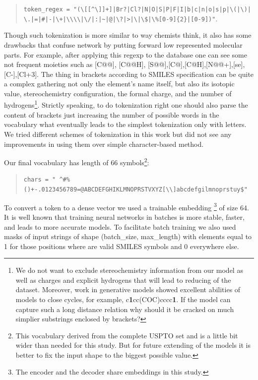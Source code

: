 \documentclass{article}
\begin{document}
\begin{quote}
\texttt{token\_regex = "(\textbackslash[[\textasciicircum \textbackslash]]+]|Br?|Cl?|N|O|S|P|F|I|b|c|n|o|s|p|\textbackslash(|\textbackslash)| \textbackslash.|=|\#|-|\textbackslash+|\textbackslash\textbackslash\textbackslash\textbackslash|\textbackslash/|:|\textasciitilde|@|\textbackslash?|>|\textbackslash*|\textbackslash\$|\textbackslash\%[0-9]\{2\}|[0-9])"}.
\end{quote}

Though such tokenization is more similar to way chemists think, it also has some drawbacks that confuse network by putting forward low represented molecular parts. For example, after applying this regexp to the database one can see some not frequent moieties such as [C@@], [C@@H], [S@@],[C@],[C@H],[N@@+],[se],[C-],[Cl+3]. The thing in brackets according to SMILES specification can be quite a complex gathering not only the element's name itself, but also its isotopic value, stereochemistry configuration, the formal charge, and the number of hydrogens\footnote{We do not want to exclude stereochemistry information from our model as well as charges and explicit hydrogens that will lead to reducing of the dataset. Moreover, work in generative models showed excellent abilities of models to close cycles, for example, c\textbf{1}cc(COC)cccc\textbf{1}. If the model can capture such a long distance relation why should it be cracked on much simplier substrings enclosed by brackets?}. Strictly speaking, to do tokenization right one should also parse the content of brackets just increasing the number of possible words in the vocabulary what eventually leads to the simplest tokenization only with letters. We tried different schemes of tokenization in this work but did not see any improvements in using them over simple character-based method.

Our final vocabulary has length of 66 symbols\footnote{This vocabulary derived from the complete USPTO set and is a little bit wider than needed for this study. But for future extending of the models it is better to fix the input shape to the biggest possible value.}:

\begin{quote}
\texttt{chars = " \textasciicircum\#\%()+-.\/0123456789=@ABCDEFGHIKLMNOPRSTVXYZ[\textbackslash\textbackslash]abcdefgilmnoprstuy\$"}
\end{quote}

To convert a token to a dense vector we used a trainable embedding
\footnote{The encoder and the decoder share embeddings in this study.} of size 64. 
It is well known that training neural networks in batches is more stable, faster, and leads to more accurate models. 
To facilitate batch training we also used masks of input strings of shape (batch\_size, max\_length) 
with elements equal to 1 for those positions where are valid SMILES symbols and 0 everywhere else. 
\end{document}
